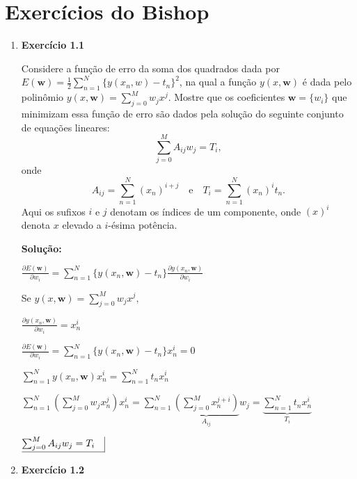 \section*{Exercícios do Bishop}

\begin{enumerate}


\item \textbf{Exercício 1.1} \par

Considere a função de erro da soma dos quadrados dada por $E(\boldsymbol{w})=\frac{1}{2}\sum_{n=1}^{N} \{y(x_n,w)-t_n\}^2$, na qual a função $y(x,\boldsymbol{w})$ é dada pelo polinômio $y(x,\boldsymbol{w})=\sum_{j=0}^{M} w_jx^j$. Mostre que os coeficientes $\boldsymbol{w} = \{w_i\}$ que minimizam essa função de erro são dados pela solução do seguinte conjunto de equações lineares:
\begin{equation*}
    \sum_{j=0}^{M}A_{ij} w_j = T_i, 
\end{equation*}
onde 
\begin{equation*}
    A_{ij} = \sum_{n=1}^{N} (x_n)^{i+j} \quad \text{e} \quad T_i=\sum_{n=1}^{N} (x_n)^i t_n.
\end{equation*}
Aqui os sufixos $i$ e $j$ denotam os índices de um componente, onde $(x)^i$ denota $x$ elevado a $i$-ésima potência.
\newline \par
\textbf{Solução:}

$\frac{\partial E(\boldsymbol{w})}{\partial w_i} = \sum_{n=1}^{N} \{y(x_n, \boldsymbol{w}) - t_n\} \frac{\partial y(x_n, \boldsymbol{w})}{\partial w_i}$ 

Se $y(x,\boldsymbol{w})=\sum_{j=0}^{M} w_j x^j,$ 

$\frac{\partial y(x_n, \boldsymbol{w})}{\partial w_i} = x_n^i $

$ \frac{\partial E(\boldsymbol{w})}{\partial w_i} = \sum_{n=1}^{N} \{y(x_n, \boldsymbol{w}) - t_n\} x_n^i = 0 $

$\sum_{n=1}^{N} y(x_n, \boldsymbol{w})x_n^i = \sum_{n=1}^{N} t_n x_n^i$

$\sum_{n=1}^{N} \left( \sum_{j=0}^{M} w_j x_n^j \right) x_n^i = \sum_{n=1}^{N} \underbrace{\left( \sum_{j=0}^{M} x_n^{j+i} \right)}_{A_{ij}} w_j = \underbrace{\sum_{n=1}^{N} t_n x_n^i}_{T_i}$

$ \underline{\sum_{j=0}^{M}A_{ij} w_j = T_i\quad} \vline $

\item \textbf{Exercício 1.2} \par


\end{enumerate}
